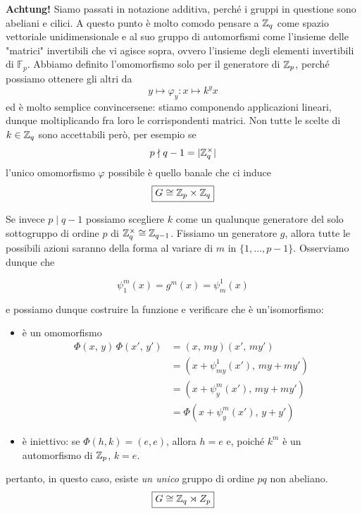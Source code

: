 \begin{multicols}{2}
\textbf{Achtung!} Siamo passati in notazione additiva, perché i gruppi in questione sono abeliani e cilici. A questo punto è molto comodo pensare a $ \mathbb{Z}_q $ come spazio vettoriale unidimensionale e al suo gruppo di automorfismi come l'insieme delle "matrici" invertibili che vi agisce sopra, ovvero l'insieme degli elementi invertibili di $ \mathbb{F}_p $. Abbiamo definito l'omomorfismo solo per il generatore di $ \mathbb{Z}_p $, perché possiamo ottenere gli altri da
\[ y \mapsto \varphi_y : x \mapsto k^yx \]
ed è molto semplice convincersene: stiamo componendo applicazioni lineari, dunque moltiplicando fra loro le corrispondenti matrici.
Non tutte le scelte di $ k \in \mathbb{Z}_q $ sono accettabili però, per esempio se 
$$  p \nmid q-1 = |\mathbb{Z}_q^\times| $$
l'unico omomorfismo $ \varphi $ possibile è quello banale che ci induce
\[ \boxed{G \cong \mathbb{Z}_p \times \mathbb{Z}_q} \]

Se invece 
$ p \mid q -1 $
possiamo scegliere $ k $ come un qualunque generatore del solo sottogruppo di ordine $ p $ di $ \mathbb{Z}_q^\times \cong \mathbb{Z}_{q-1} $. Fissiamo un generatore $ g $, allora tutte le possibili azioni saranno della forma 
al variare di $ m $ in $ \{1, \dots, p-1\} $.
Osserviamo dunque che

\[ \psi^m_1(x) = g^{m}(x) = \psi^1_m(x) \]


e possiamo dunque costruire la funzione
e verificare che è un'isomorfismo:
\begin{itemize}
	\item è un omomorfismo
	\begin{align*} \Phi(x,\, y)\,\Phi(x',\, y') &= (x,\, my)(x',\, my') \\&= (x + \psi_{my}^1(x'), \,my + my')
	\\&= (x + \psi_y^{m}(x'),\, my + my') \\&= \Phi(x + \psi^m_y(x'),\, y + y')  \end{align*} 
	\item è iniettivo: se $ \Phi(h, k) = (e, e) $, allora $ h = e $ e, poiché $ k^m $ è un automorfismo di $ \mathbb{Z}_p $, $ k = e $.
\end{itemize}
pertanto, in questo caso, esiste \emph{un unico} gruppo di ordine $ pq $ non abeliano. 
\[ \boxed{G \cong \mathbb{Z}_q \rtimes Z_p} \]



\end{multicols}

